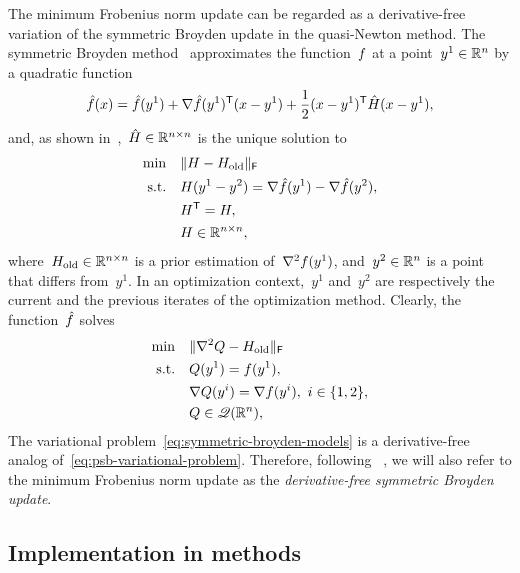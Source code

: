 The minimum Frobenius norm update can be regarded as a derivative-free variation of the symmetric Broyden update in the quasi-Newton method.
The symmetric Broyden method~\cite{Powell_1970b} approximates the function~$f$ at a point~$y^1 \in \mathbb{R}^n$ by a quadratic function
\begin{align*}
    \objm(x) = \objm(y^1) + \nabla \objm(y^1)^{\T} (x - y^1) + \frac{1}{2} (x - y^1)^{\T} \hat{H} (x - y^1),
\end{align*}
and, as shown in~\cite[thm.~4.2]{Dennis_Schnabel_1979},~$\hat{H} \in \mathbb{R}^{n \times n}$ is the unique solution to
\begin{align*}
    \min        & \quad \norm{H - H_{\text{old}}}_{\mathsf{F}}\\
    \text{s.t.} & \quad H (y^1 - y^2) = \nabla \objm(y^1) - \nabla \objm(y^2),\\
                & \quad H^{\T} = H,\\
                & \quad H \in \R^{n \times n},
\end{align*}
where~$H_{\text{old}} \in \mathbb{R}^{n \times n}$ is a prior estimation of~$\nabla^2 f(y^1)$, and~$y^2 \in \mathbb{R}^n$ is a point that differs from~$y^1$.
In an optimization context,~$y^1$ and~$y^2$ are respectively the current and the previous iterates of the optimization method.
Clearly, the function~$\objm$ solves
\begin{subequations}
    \label{eq:psb-variational-problem}
    \begin{align}
        \min        & \quad \lVert\nabla^2 Q - H_{\text{old}}\rVert_{\mathsf{F}}\\
        \text{s.t.} & \quad Q(y^1) = f(y^1),\\
                    & \quad \nabla Q(y^i) = \nabla f(y^i), ~ i \in \{1, 2\},\\
                    & \quad Q \in \mathscr{Q}(\mathbb{R}^n),
    \end{align}
\end{subequations}
The variational problem~\cref{eq:symmetric-broyden-models} is a derivative-free analog of~\cref{eq:psb-variational-problem}.
Therefore, following \citeauthor{Powell_2013}~\cite{Powell_2013}, we will also refer to the minimum Frobenius norm update as the \emph{derivative-free symmetric Broyden update}.

\subsection{Implementation in  methods}

